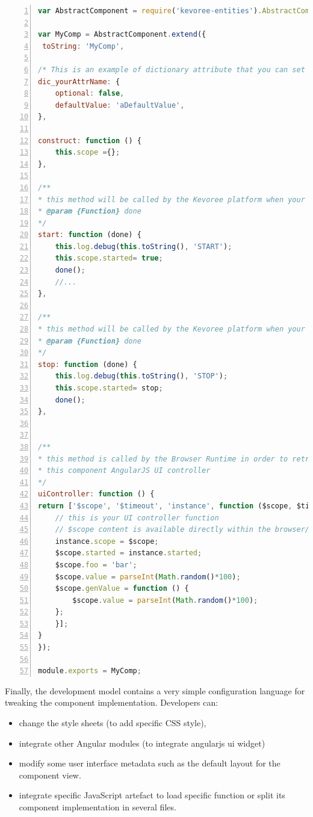 \begin{lstlisting}[language=JavaScript,numbers=left,firstnumber=1,basicstyle=\scriptsize,deletekeywords={port}]
var AbstractComponent = require('kevoree-entities').AbstractComponent;

var MyComp = AbstractComponent.extend({
 toString: 'MyComp',

/* This is an example of dictionary attribute that you can set for your entity */
dic_yourAttrName: {
	optional: false,
	defaultValue: 'aDefaultValue',
},

construct: function () {
	this.scope ={};
},

/**
* this method will be called by the Kevoree platform when your component has to start
* @param {Function} done
*/
start: function (done) {
	this.log.debug(this.toString(), 'START');
	this.scope.started= true;
	done();
	//...
},

/**
* this method will be called by the Kevoree platform when your component has to stop
* @param {Function} done
*/
stop: function (done) {
	this.log.debug(this.toString(), 'STOP');
	this.scope.started= stop;
	done();
},


/**
* this method is called by the Browser Runtime in order to retrieve
* this component AngularJS UI controller
*/
uiController: function () {
return ['$scope', '$timeout', 'instance', function ($scope, $timeout, instance) {
	// this is your UI controller function
	// $scope content is available directly within the browser/kevoree-comp-foocomp.html file
	instance.scope = $scope;
	$scope.started = instance.started;
	$scope.foo = 'bar';
	$scope.value = parseInt(Math.random()*100);
	$scope.genValue = function () {
		$scope.value = parseInt(Math.random()*100);
	};
	}];
}
});

module.exports = MyComp;
\end{lstlisting}


Finally, the development model contains a very simple configuration language for tweaking the component implementation. Developers can: 

\begin{itemize}
	\item change the style sheets (to add specific CSS style), 
	\item integrate other Angular modules (to integrate angularjs ui widget)  
	\item modify some user interface metadata such as the default layout for the component view. 
	\item integrate specific JavaScript artefact to load specific function or split its component implementation in several files. 
	\end{itemize}
 
